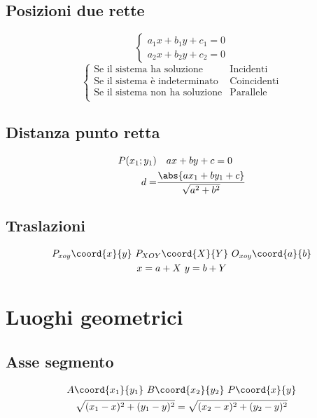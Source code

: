 \section{Posizioni due rette}
\begin{equation*}
\begin{cases}
a_1x+b_1y+c_1=0\\
a_2x+b_2y+c_2=0
\end{cases}
\end{equation*}
\begin{equation*}
\begin{cases}
\text{Se il sistema ha soluzione}& \text{Incidenti}\\
\text{Se il sistema è indeterminato}& \text{Coincidenti}\\
\text{Se il sistema non ha soluzione}& \text{Parallele}\\
\end{cases}
\end{equation*}
\section{Distanza punto retta}
\begin{align*}
P(x_1;y_1)&\quad ax+by+c=0\\
d=&\dfrac{\abs{ax_1+by_1+c}}{\sqrt{a^2+b^2}}
\end{align*}
\section{Traslazioni}
\begin{gather*}
 P_{xoy}\coord{x}{y}\ P_{XOY}\coord{X}{Y}\ O_{xoy}\coord{a}{b}\notag\\  x=a+X\  y=b+Y
\end{gather*}
\chapter{Luoghi geometrici}
\section{Asse segmento}
\begin{gather*}
A\coord{x_1}{y_1}\ B\coord{x_2}{y_2}\ P\coord{x}{y}\notag\\
\sqrt{(x_1-x)^2+(y_1-y)^2}=\sqrt{(x_2-x)^2+(y_2-y)^2}
\end{gather*}
